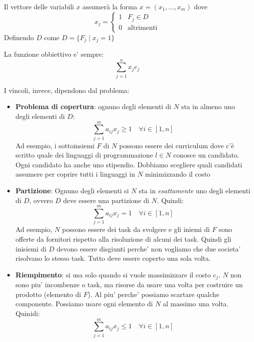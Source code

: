 Il vettore delle variabili $ x $ assumerà la forma $ x = (x_1,...,x_m) $ dove
\[
  x_j = \begin{cases}
  1 & F_j \in D\\
  0 & \text{altrimenti}
  \end{cases}
\]
Definendo $D$ come $D = \{F_j \mid x_j = 1\}$

La funzione obbiettivo e' sempre:
\[
\sum_{j=1}^{n} x_j c_j
\]

I vincoli, invece, dipendono dal problema:
\begin{itemize}
\item \textbf{Problema di copertura}: ognuno degli elementi di $N$ sta in almeno uno degli elementi di $ D $:
    \[
      \sum_{j=1}^{m} a_{ij}x_j \geq 1 \quad \forall i \in [1,n]
    \]
   Ad esempio, i sottoinsiemi $ F $ di $ N $ possono essere dei curriculum dove c'è scritto quale dei linguaggi di programmazione $ l \in N $ conosce un candidato. Ogni candidato ha anche uno stipendio. Dobbiamo scegliere quali candidati assumere per coprire tutti i linguaggi in $ N $ minimizzando il costo
  \item \textbf{Partizione}: Ognuno degli elementi si $N$ sta in \textit{esattamente} uno degli elementi di $D$, ovvero $D$ deve essere una partizione di $ N $. Quindi:
    \[
    \sum_{j=1}^{m} a_{ij}x_j = 1 \quad \forall i \in [1,n]
    \]
    Ad esempio, $ N $ possono essere dei task da svolgere e gli iniemi di $ F $ sono offerte da fornitori rispetto alla risoluzione di alcuni dei task. Quindi gli inisiemi di $ D $ devono essere disgiunti perche' non vogliamo che due societa' risolvano lo stesso task. Tutto deve essere coperto una sola volta.

  \item \textbf{Riempimento}: si usa solo quando si vuole massimizzare il costo $c_j$. $ N $ non sono piu' incombenze o task, ma risorse da usare una volta per costruire un prodotto (elemento di $ F $). Al piu' perche' possiamo scartare qualche componente. Possiamo usare ogni elemento di $ N $ al massimo una volta. Quinidi:
  \[
    \sum^m_{j=1} a_{ij}x_j \leq 1 \quad \forall i\in [1,n]
  \]
\end{itemize}

